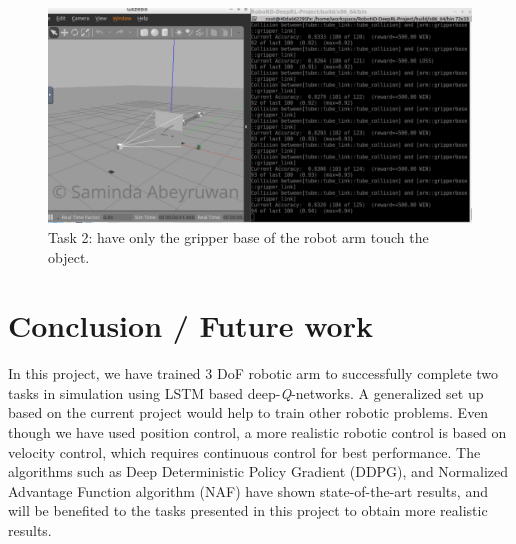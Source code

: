 \documentclass[10pt,journal,compsoc]{IEEEtran}
\begin{document}
\begin{figure}[thpb]
      \centering
      \includegraphics[width=\linewidth]{task2}
      \caption{Task 2: have only the gripper base of the robot arm touch the object.}
      \label{fig:task2}
\end{figure}


\section{Conclusion / Future work}

In this project, we have trained 3 DoF robotic arm to successfully complete two tasks in simulation using  LSTM based deep-\textit{Q}-networks. A generalized set up based on the current project would help to train other robotic problems. Even though we have used position control, a more realistic robotic control is based on velocity control, which requires continuous control for best performance. The algorithms such as Deep Deterministic Policy Gradient (DDPG), and Normalized Advantage Function algorithm (NAF)  \cite{GuHolLilLev17} have shown state-of-the-art results, and will be benefited to the tasks presented in this project to obtain more realistic results. 




\end{document}
